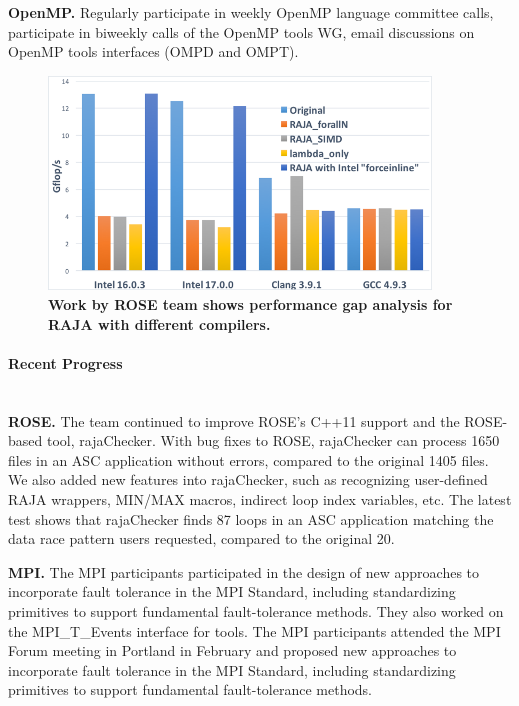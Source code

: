 \textbf{OpenMP.} Regularly participate in weekly OpenMP language committee calls, participate in biweekly calls of the OpenMP tools WG, email discussions on OpenMP tools interfaces (OMPD and OMPT).

\begin{figure}[htb]
        \centering
        \includegraphics[width=4in]{projects/2.3.1-PMR/2.3.1.03-LLNL-ATDM-PMR/ROSE-raja}
        \caption{\label{fig:rose-raja}\textbf{Work by ROSE team shows
performance gap analysis for RAJA with different compilers.}}
\end{figure}




\paragraph{Recent Progress} \leavevmode \\



\textbf{ROSE.} The team continued to improve ROSE's C++11 support 
and the ROSE-based 
tool, rajaChecker. With bug fixes to ROSE, rajaChecker can process 
1650 files in an ASC application without errors, compared to the original 
1405 files.  We also added new features into rajaChecker, such as recognizing 
user-defined RAJA wrappers, MIN/MAX macros, indirect loop index variables, 
etc.  The latest test shows that rajaChecker finds 87 loops in an 
ASC application matching the data race pattern users requested, compared 
to the original 20.



\textbf{MPI.} The MPI participants participated in the design of new 
approaches to incorporate fault tolerance in the MPI Standard, including 
standardizing primitives to support fundamental fault-tolerance methods.  
They also worked on the MPI\_T\_Events interface for tools.
The MPI participants attended the MPI Forum meeting in Portland in 
February and proposed new approaches to incorporate fault tolerance in the 
MPI Standard, including standardizing primitives to support fundamental 
fault-tolerance methods.

